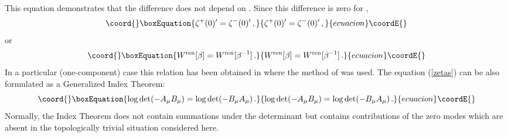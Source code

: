\documentclass[a4paper,12pt]{article}
\begin{document}
This equation demonstrates that the difference
\coordHE{} does not depend on \myHighlight{$\beta$}\coordHE{}.
Since this difference is zero for \coordHE{},
\begin{equation}\coord{}\boxEquation{
\zeta^+(0)'=\zeta^-(0)'\,,
\label{zetas}
}{
\zeta^+(0)'=\zeta^-(0)'\,,
}{ecuacion}\coordE{}\end{equation}
or
\begin{equation}\coord{}\boxEquation{
W^{\mbox{\scriptsize ren}}[\beta ]=
W^{\mbox{\scriptsize ren}} [\beta^{-1} ] \,.
\label{symWren}
}{
W^{\mbox{\scriptsize ren}}[\beta ]=
W^{\mbox{\scriptsize ren}} [\beta^{-1} ] \,.
}{ecuacion}\coordE{}\end{equation}
In a particular (one-component) case this relation has been
obtained in \cite{SchwarzZeitlin93} where the method of
\cite{Schwarz79} was used.
The equation (\ref{zetas}) can be also formulated as a
Generalized Index Theorem:
\begin{equation}\coord{}\boxEquation{
\log \det (-A_\mu B_\mu )=
\log \det (-B_\mu A_\mu ) \,.
\label{GIT}
}{
\log \det (-A_\mu B_\mu )=
\log \det (-B_\mu A_\mu ) \,.
}{ecuacion}\coordE{}\end{equation}
Normally, the Index Theorem does not contain summations
under the determinant but contains contributions
of the zero modes which are absent in the topologically
trivial situation considered here.
\end{document}
